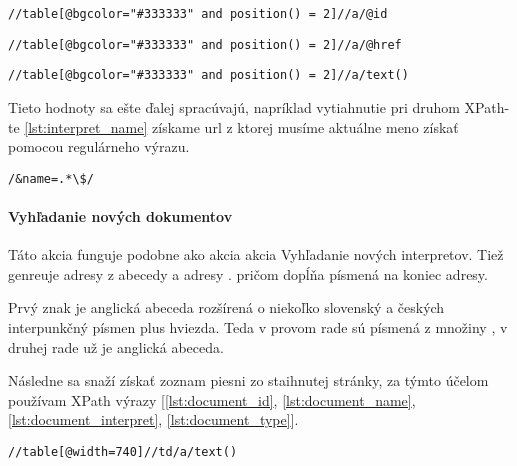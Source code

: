 \begin{lstlisting}[caption=XPath na vyhľadanie interpretovho identifikátora,
    label=lst:interpret_id]
//table[@bgcolor="#333333" and position() = 2]//a/@id
\end{lstlisting}

\begin{lstlisting}[caption=XPath na vyhľadanie interpretovho mena,label=lst:interpret_name]
//table[@bgcolor="#333333" and position() = 2]//a/@href
\end{lstlisting}

\begin{lstlisting}[caption=XPath na vyhľadanie interpretovho aliasu,label=lst:interpret_alias]
//table[@bgcolor="#333333" and position() = 2]//a/text()
\end{lstlisting}

Tieto hodnoty sa ešte ďalej spracúvajú, napríklad vytiahnutie pri druhom XPath-te
\ref{lst:interpret_name} 
získame url z ktorej musíme aktuálne meno získať pomocou regulárneho výrazu.

\begin{lstlisting}[caption=Regulárny výraz na získanie mena interpreta z url interpreta,
    label=lst:regex_interpret_name]
/&name=.*\$/
\end{lstlisting}

\paragraph{Vyhľadanie nových dokumentov}

Táto akcia funguje podobne ako akcia akcia Vyhľadanie nových interpretov. Tiež genreuje adresy
z abecedy a adresy .
pričom dopĺňa písmená na koniec adresy.

Prvý znak je anglická abeceda rozšírená o niekoľko slovenský a českých interpunkčný písmen
plus hviezda. Teda v provom rade sú písmená z množiny ,
v druhej rade už je anglická abeceda.

Následne sa snaží získať zoznam piesni zo staihnutej stránky, za týmto účelom používam
XPath výrazy [\ref{lst:document_id}, \ref{lst:document_name}, \ref{lst:document_interpret}, 
\ref{lst:document_type}].

\begin{lstlisting}[caption=XPath na vyhľadanie názvou piesni,label=lst:document_name]
//table[@width=740]//td/a/text()
\end{lstlisting}


